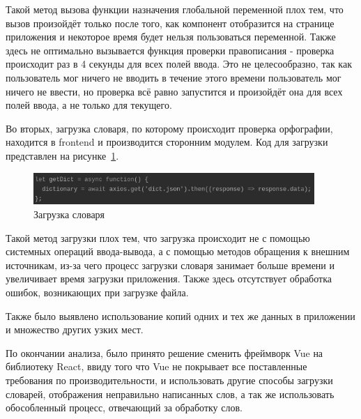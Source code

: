 Такой метод вызова функции назначения глобальной переменной плох тем, что вызов произойдёт только после того, как компонент отобразится на странице приложения и некоторое время будет нельзя пользоваться переменной. Также здесь не оптимально вызывается функция проверки правописания - проверка происходит раз в 4 секунды для всех полей ввода. Это не целесообразно, так как пользователь мог ничего не вводить в течение этого времени пользователь мог ничего не ввести, но проверка всё равно запустится и произойдёт она для всех полей ввода, а не только для текущего.

Во вторых, загрузка словаря, по которому происходит проверка орфографии, находится в frontend и производится сторонним модулем. Код для загрузки представлен на рисунке~\ref{img:dictionary}.

\begin{figure}[H]
  \centering
  \includegraphics[width=0.95\textwidth]{assets/images/practical/dictionary.png}
  \caption{Загрузка словаря}
  \label{img:dictionary}
\end{figure}

Такой метод загрузки плох тем, что загрузка происходит не с помощью системных операций ввода-вывода, а с помощью методов обращения к внешним источникам, из-за чего процесс загрузки словаря занимает больше времени и увеличивает время загрузки приложения. Также здесь отсутствует обработка ошибок, возникающих при загрузке файла.

Также было выявлено использование копий одних и тех же данных в приложении и множество других узких мест.

По окончании анализа, было принято решение сменить фреймворк Vue на библиотеку React, ввиду того что Vue не покрывает все поставленные требования по производительности, и использовать другие способы загрузки словарей, отображения неправильно написанных слов, а так же использовать обособленный процесс, отвечающий за обработку слов.
